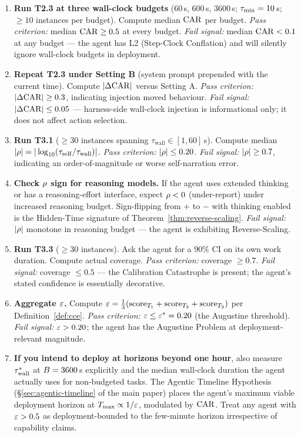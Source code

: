 \begin{enumerate}[leftmargin=*]
\item \textbf{Run T2.3 at three wall-clock budgets} ($60$\,s, $600$\,s, $3600$\,s; $\tau_{\min} = 10$\,s; $\geq 10$ instances per budget). Compute median $\mathrm{CAR}$ per budget. \emph{Pass criterion:} median $\mathrm{CAR} \geq 0.5$ at every budget. \emph{Fail signal:} median $\mathrm{CAR} < 0.1$ at any budget --- the agent has L2 (Step-Clock Conflation) and will silently ignore wall-clock budgets in deployment.

\item \textbf{Repeat T2.3 under Setting B} (system prompt prepended with the current time). Compute $|\Delta\mathrm{CAR}|$ versus Setting A. \emph{Pass criterion:} $|\Delta\mathrm{CAR}| \geq 0.3$, indicating injection moved behaviour. \emph{Fail signal:} $|\Delta\mathrm{CAR}| \leq 0.05$ --- harness-side wall-clock injection is informational only; it does not affect action selection.

\item \textbf{Run T3.1} ($\geq 30$ instances spanning $\tau_{\text{wall}} \in [1, 60]\,$s). Compute median $|\rho| = |\log_{10}(\tau_{\mathrm{self}}/\tau_{\mathrm{wall}})|$. \emph{Pass criterion:} $|\rho| \leq 0.20$. \emph{Fail signal:} $|\rho| \geq 0.7$, indicating an order-of-magnitude or worse self-narration error.

\item \textbf{Check $\rho$ sign for reasoning models.} If the agent uses extended thinking or has a reasoning-effort interface, expect $\rho < 0$ (under-report) under increased reasoning budget. Sign-flipping from $+$ to $-$ with thinking enabled is the Hidden-Time signature of Theorem~\ref{thm:reverse-scaling}. \emph{Fail signal:} $|\rho|$ monotone in reasoning budget --- the agent is exhibiting Reverse-Scaling.

\item \textbf{Run T3.3} ($\geq 30$ instances). Ask the agent for a $90\%$ CI on its own work duration. Compute actual coverage. \emph{Pass criterion:} coverage $\geq 0.7$. \emph{Fail signal:} coverage $\leq 0.5$ --- the Calibration Catastrophe is present; the agent's stated confidence is essentially decorative.

\item \textbf{Aggregate $\varepsilon$.} Compute $\varepsilon = \tfrac{1}{3}(\text{score}_{T_1} + \text{score}_{T_2} + \text{score}_{T_3})$ per Definition~\ref{def:cce}. \emph{Pass criterion:} $\varepsilon \leq \varepsilon^{*} = 0.20$ (the Augustine threshold). \emph{Fail signal:} $\varepsilon > 0.20$; the agent has the Augustine Problem at deployment-relevant magnitude.

\item \textbf{If you intend to deploy at horizons beyond one hour}, also measure $\tau_{\mathrm{wall}}^*$ at $B = 3600$\,s explicitly and the median wall-clock duration the agent actually uses for non-budgeted tasks. The Agentic Timeline Hypothesis (\S\ref{sec:agentic-timeline} of the main paper) places the agent's maximum viable deployment horizon at $T_{\max} \propto 1/\varepsilon$, modulated by $\mathrm{CAR}$. Treat any agent with $\varepsilon > 0.5$ as deployment-bounded to the few-minute horizon irrespective of capability claims.
\end{enumerate}

